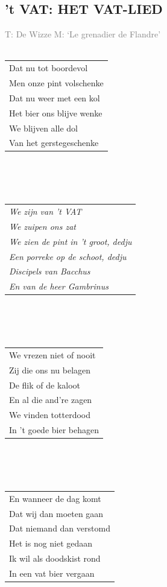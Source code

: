 \documentclass[a4paper, 14pt]{extarticle}
\begin{document}
\subsection*{'t VAT: HET VAT-LIED}
\textcolor{gray}{T: De Wizze M: ‘Le grenadier de Flandre’}
\\\\
\begin{tabularx}{\textwidth}{>{\raggedright\arraybackslash}X}
Dat nu tot boordevol\\
Men onze pint volschenke\\
Dat nu weer met een kol\\
Het bier ons blijve wenke\\
We blijven alle dol\\
Van het gerstegeschenke\\
\end{tabularx}
\\\\\\
\begin{tabularx}{\textwidth}{>{\raggedright\arraybackslash}X}
    \textit{We zijn van ’t VAT}\\
    \textit{We zuipen ons zat}\\
    \textit{We zien de pint in ’t groot, dedju}\\
    \textit{Een porreke op de schoot, dedju}\\
    \textit{Discipels van Bacchus}\\
    \textit{En van de heer Gambrinus}\\
\end{tabularx}
\\\\\\
\begin{tabularx}{\textwidth}{>{\raggedright\arraybackslash}X}
We vrezen niet of nooit\\
Zij die ons nu belagen\\
De flik of de kaloot\\
En al die and’re zagen\\
We vinden totterdood\\
In ’t goede bier behagen\\
\end{tabularx}
\\\\\\
\begin{tabularx}{\textwidth}{>{\raggedright\arraybackslash}X}
En wanneer de dag komt\\
Dat wij dan moeten gaan\\
Dat niemand dan verstomd\\
Het is nog niet gedaan\\
Ik wil als doodskist rond\\
In een vat bier vergaan \\
\end{tabularx}
\end{document}
